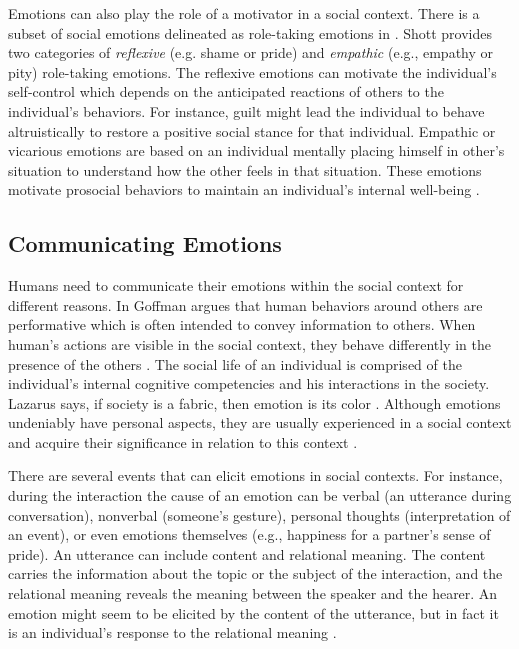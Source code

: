 \documentclass[12pt]{report}
\begin{document}
Emotions can also play the role of a motivator in a social context. There is a
subset of social emotions delineated as role-taking emotions in
\cite{shott:emotion-social-life}. Shott provides two categories of
\textit{reflexive} (e.g. shame or pride) and \textit{empathic} (e.g., empathy or
pity) role-taking emotions. The reflexive emotions can motivate the individual's
self-control which depends on the anticipated reactions of others to the
individual's behaviors. For instance, guilt might lead the individual to behave
altruistically to restore a positive social stance for that individual. Empathic
or vicarious emotions are based on an individual mentally placing himself in
other's situation to understand how the other feels in that situation. These
emotions motivate prosocial behaviors to maintain an individual's internal
well-being \cite{thoits:socialogy-emotion}.

\subsection{Communicating Emotions}
\label{section-emotion-comm}

Humans need to communicate their emotions within the social context for
different reasons. In \cite{goffman:self-presentation} Goffman argues that human
behaviors around others are performative which is often intended to convey
information to others. When human's actions are visible in the social context,
they behave differently in the presence of the others
\cite{zajonc:social-facilitation}. The social life of an individual is comprised
of the individual's internal cognitive competencies and his interactions in the
society. Lazarus says, if society is a fabric, then emotion is its color
\cite{lazarus:emotion-adaptation}. Although emotions undeniably have personal
aspects, they are usually experienced in a social context and acquire their
significance in relation to this context
\cite{parkinson:emotion-social-interaction}.

There are several events that can elicit emotions in social contexts. For
instance, during the interaction the cause of an emotion can be verbal (an
utterance during conversation), nonverbal (someone's gesture), personal thoughts
(interpretation of an event), or even emotions themselves (e.g., happiness for a
partner's sense of pride). An utterance can include content and relational
meaning. The content carries the information about the topic or the subject of
the interaction, and the relational meaning reveals the meaning between the
speaker and the hearer. An emotion might seem to be elicited by the content of
the utterance, but in fact it is an individual's response to the relational
meaning \cite{planalp:communicating-emotion}. 
\end{document}
